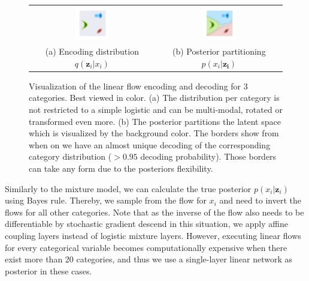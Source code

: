 \begin{figure}[t!]
    \centering
    \setlength{\tabcolsep}{20pt}
    \begin{tabular}{cc}
        \includegraphics[width=0.28\textwidth]{figures/appendix_figures/encoding_dist_linear_flows_pure.pdf} & \includegraphics[width=0.28\textwidth]{figures/appendix_figures/encoding_dist_linear_flows.pdf} \\[3.5mm]
        (a) Encoding distribution $q(\bm{z}_i|x_i)$ & (b) Posterior partitioning $p(x_i|\bm{z_i})$ \\
    \end{tabular}
    \caption[Linear flow encoding]{Visualization of the linear flow encoding and decoding for 3 categories. Best viewed in color. (a) The distribution per category is not restricted to a simple logistic and can be multi-modal, rotated or transformed even more. (b) The posterior partitions the latent space which is visualized by the background color. The borders show from when on we have an almost unique decoding of the corresponding category distribution ($>0.95$ decoding probability). Those borders can take any form due to the posteriors flexibility.}
    \label{fig:methodology_encoding_dist_linear_flows}
\end{figure}

Similarly to the mixture model, we can calculate the true posterior $p(x_i|\bm{z}_i)$ using Bayes rule. 
Thereby, we sample from the flow for $x_i$ and need to invert the flows for all other categories. 
Note that as the inverse of the flow also needs to be differentiable by stochastic gradient descend in this situation, we apply affine coupling layers instead of logistic mixture layers.
However, executing linear flows for every categorical variable becomes computationally expensive when there exist more than 20 categories, and thus we use a single-layer linear network as posterior in these cases.


